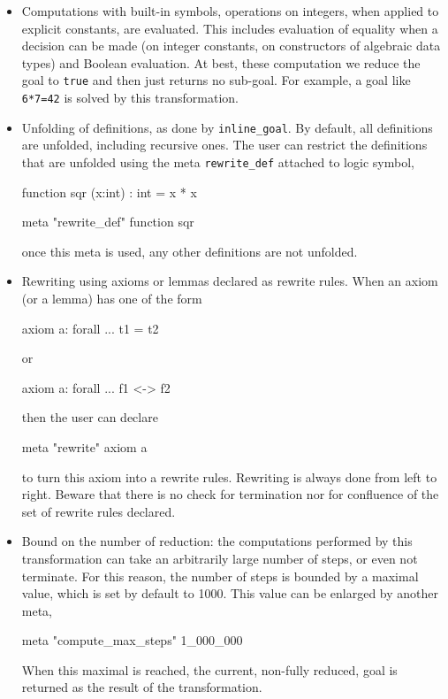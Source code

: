 \begin{itemize}
\item Computations with built-in symbols, \eg operations on integers,
  when applied to explicit constants, are evaluated. This includes
  evaluation of equality when a decision can be made (on integer
  constants, on constructors of algebraic data types) and Boolean
  evaluation. At best, these computation we reduce the goal to
  \verb|true| and then just returns no sub-goal. For example, a goal
  like \verb|6*7=42| is solved by this transformation.
\item Unfolding of definitions, as done by \verb|inline_goal|. By
  default, all definitions are unfolded, including recursive ones. The
  user can restrict the definitions that are unfolded using the meta
  \verb|rewrite_def| attached to logic symbol, \eg
\begin{whycode}
function sqr (x:int) : int = x * x

meta "rewrite_def" function sqr
\end{whycode}
  once this meta is used, any other definitions are not unfolded.
\item Rewriting using axioms or lemmas declared as rewrite rules. When
  an axiom (or a lemma) has one of the form
\begin{whycode}
  axiom a: forall ... t1 = t2
\end{whycode}
  or
\begin{whycode}
  axiom a: forall ... f1 <-> f2
\end{whycode}
  then the user can declare
\begin{whycode}
  meta "rewrite" axiom a
\end{whycode}
  to turn this axiom into a rewrite rules. Rewriting is always done
  from left to right. Beware that there is no check for termination
  nor for confluence of the set of rewrite rules declared.
\item Bound on the number of reduction: the computations performed by
  this transformation can take an arbitrarily large number of steps,
  or even not terminate. For this reason, the number of steps is
  bounded by a maximal value, which is set by default to 1000. This
  value can be enlarged by another meta, \eg
\begin{whycode}
meta "compute_max_steps" 1_000_000
\end{whycode}
  When this maximal is reached, the current, non-fully reduced, goal
  is returned as the result of the transformation.
\end{itemize}



